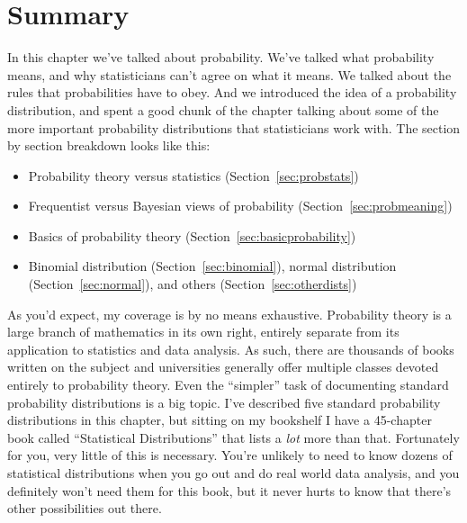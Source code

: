 \section{Summary}

In this chapter we've talked about probability. We've talked what probability means, and why statisticians can't agree on what it means. We talked about the rules that probabilities have to obey. And we introduced the idea of a probability distribution, and spent a good chunk of the chapter talking about some of the more important probability distributions that statisticians work with. The section by section breakdown looks like this:

\begin{itemize} \itemsep -2pt
\item Probability theory versus statistics (Section~\ref{sec:probstats})
\item Frequentist versus Bayesian views of probability (Section~\ref{sec:probmeaning})
\item Basics of probability theory (Section~\ref{sec:basicprobability})
\item Binomial distribution (Section~\ref{sec:binomial}), normal distribution (Section~\ref{sec:normal}), and others (Section~\ref{sec:otherdists})
\end{itemize}

As you'd expect, my coverage is by no means exhaustive. Probability theory is a large branch of mathematics in its own right, entirely separate from its application to statistics and data analysis. As such, there are thousands of books written on the subject and universities generally offer multiple classes devoted entirely to probability theory. Even the ``simpler'' task of documenting standard probability distributions is a big topic. I've described five standard probability distributions in this chapter, but sitting on my bookshelf I have a 45-chapter book called ``Statistical Distributions'' \cite{Evans2000} that lists a {\it lot} more than that. Fortunately for you, very little of this is necessary. You're unlikely to need to know dozens of statistical distributions when you go out and do real world data analysis, and you definitely won't need them for this book, but it never hurts to know that there's other possibilities out there.

